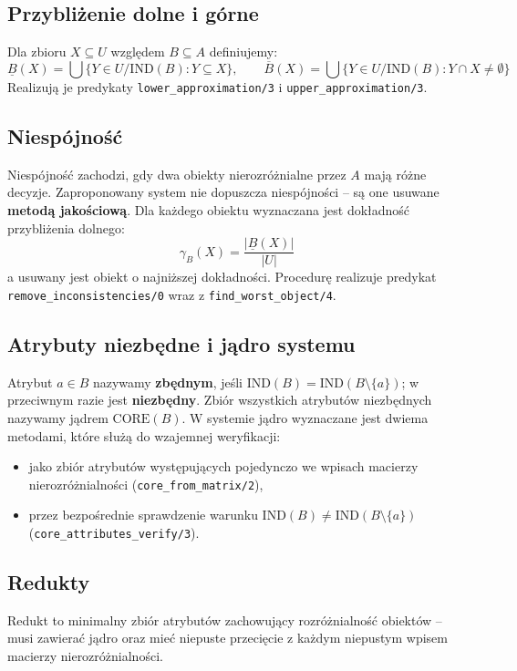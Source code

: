 \documentclass[11pt,a4paper]{article}
\newcommand{\code}[1]{\texttt{#1}}
\begin{document}
\subsection{Przybliżenie dolne i górne}
Dla zbioru $X \subseteq U$ względem $B \subseteq A$ definiujemy:
\[
\underline{B}(X) = \bigcup\{Y\in U/\mathrm{IND}(B) : Y\subseteq X\}, \qquad
\overline{B}(X) = \bigcup\{Y\in U/\mathrm{IND}(B) : Y\cap X \ne \emptyset\}
\]
Realizują je predykaty \code{lower\_approximation/3} i
\code{upper\_approximation/3}.

\subsection{Niespójność}
Niespójność zachodzi, gdy dwa obiekty nierozróżnialne przez $A$ mają różne
decyzje. Zaproponowany system nie dopuszcza niespójności -- są one usuwane
\textbf{metodą jakościową}. Dla każdego obiektu wyznaczana jest dokładność
przybliżenia dolnego:
\[
\gamma_B(X) = \frac{|\underline{B}(X)|}{|U|}
\]
a usuwany jest obiekt o najniższej dokładności. Procedurę realizuje predykat
\code{remove\_inconsistencies/0} wraz z \code{find\_worst\_object/4}.

\subsection{Atrybuty niezbędne i jądro systemu}
Atrybut $a \in B$ nazywamy \textbf{zbędnym}, jeśli
$\mathrm{IND}(B) = \mathrm{IND}(B\setminus\{a\})$; w przeciwnym razie jest
\textbf{niezbędny}. Zbiór wszystkich atrybutów niezbędnych nazywamy jądrem
$\mathrm{CORE}(B)$. W systemie jądro wyznaczane jest dwiema metodami, które
służą do wzajemnej weryfikacji:
\begin{itemize}[noitemsep]
    \item jako zbiór atrybutów występujących pojedynczo we wpisach macierzy
          nierozróżnialności (\code{core\_from\_matrix/2}),
    \item przez bezpośrednie sprawdzenie warunku
          $\mathrm{IND}(B)\ne\mathrm{IND}(B\setminus\{a\})$
          (\code{core\_attributes\_verify/3}).
\end{itemize}

\subsection{Redukty}
Redukt to minimalny zbiór atrybutów zachowujący rozróżnialność obiektów --
musi zawierać jądro oraz mieć niepuste przecięcie z każdym niepustym wpisem
macierzy nierozróżnialności.
\end{document}
